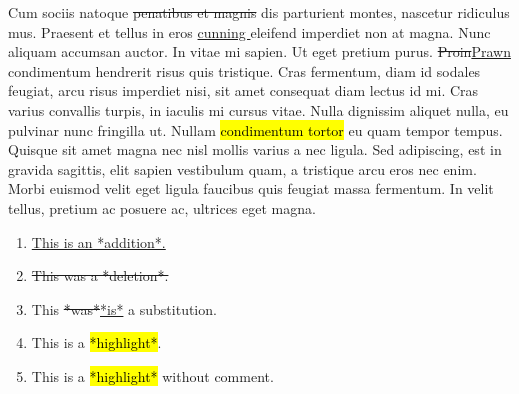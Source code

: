 Cum sociis natoque
\st{penatibus et magnis} dis
parturient montes, nascetur ridiculus mus. Praesent et tellus in eros
\underline{cunning }eleifend
imperdiet non at magna. Nunc aliquam accumsan auctor. In vitae mi
sapien. Ut eget pretium purus.
\st{Proin}\underline{Prawn}
condimentum hendrerit risus quis tristique. Cras fermentum, diam id
sodales feugiat, arcu risus imperdiet nisi, sit amet consequat diam
lectus id mi. Cras varius convallis turpis, in iaculis mi cursus vitae.
Nulla dignissim aliquet nulla, eu pulvinar nunc fringilla ut. Nullam
\hl{condimentum tortor} eu quam tempor tempus. Quisque
sit amet magna nec nisl mollis varius a nec ligula. Sed adipiscing, est
in gravida sagittis, elit sapien vestibulum quam, a
tristique arcu eros nec enim. Morbi euismod
velit eget ligula faucibus quis feugiat massa fermentum. In velit
tellus, pretium ac posuere ac, ultrices eget magna.

\begin{enumerate}
\def\labelenumi{\arabic{enumi}.}
\item
  \underline{This is an *addition*.}
\item
  \st{This was a *deletion*.}
\item
  This \st{*was*}\underline{*is*} a substitution.
\item
  This is a
  \hl{*highlight*}.
\item
  This is a \hl{*highlight*} without comment.
\end{enumerate}